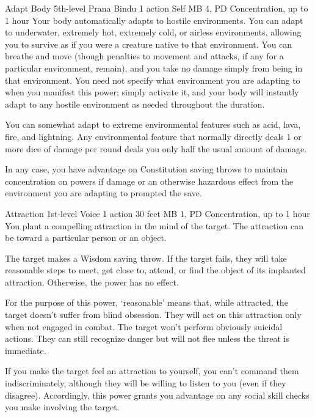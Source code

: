 \DndPowerHeader%
  {Adapt Body}
  {5th-level Prana Bindu}
  {1 action}
  {Self}
  {MB 4, PD \lvlfive}
  {Concentration, up to 1 hour}
Your body automatically adapts to hostile environments.
You can adapt to underwater, extremely hot, extremely cold,
or airless environments, allowing you to survive
as if you were a creature native to that environment.
You can breathe and move (though penalties to movement and attacks,
if any for a particular environment, remain),
and you take no damage simply from being in that environment.
You need not specify what environment you are adapting to
when you manifest this power;
simply activate it,
and your body will instantly adapt to any hostile environment
as needed throughout the duration.

You can somewhat adapt to extreme environmental features such as acid,
lava, fire, and lightning.
Any environmental feature that normally directly deals
1 or more dice of damage per round
deals you only half the usual amount of damage.

In any case,
you have advantage on Constitution saving throws to maintain
concentration on powers if damage or an otherwise
hazardous effect from the environment you are adapting to
prompted the save.

\DndPowerHeader%
  {Attraction}
  {1st-level Voice}
  {1 action}
  {30 feet}
  {MB 1, PD \lvlone}
  {Concentration, up to 1 hour}
You plant a compelling attraction in the mind of the target.
The attraction can be toward a particular person or an object.

The target makes a Wisdom saving throw.
If the target fails, they will take reasonable steps to meet,
get close to, attend, or find the object of its implanted attraction.
Otherwise, the power has no effect.

For the purpose of this power, `reasonable' means that, while attracted,
the target doesn't suffer from blind obsession.
They will act on this attraction only when not engaged in combat.
The target won't perform obviously suicidal actions.
They can still recognize danger but will not flee
unless the threat is immediate.

If you make the target feel an attraction to yourself,
you can't command them indiscriminately,
although they will be willing to listen to you (even if they disagree).
Accordingly, this power grants you advantage on any social skill checks
you make involving the target.

